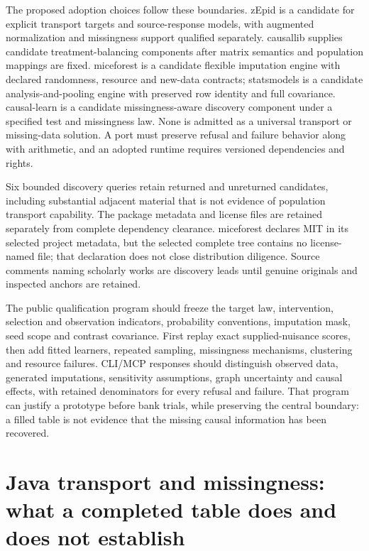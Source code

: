 The proposed adoption choices follow these boundaries. zEpid is a candidate for explicit transport targets and source-response models, with augmented normalization and missingness support qualified separately. causallib supplies candidate treatment-balancing components after matrix semantics and population mappings are fixed. miceforest is a candidate flexible imputation engine with declared randomness, resource and new-data contracts; statsmodels is a candidate analysis-and-pooling engine with preserved row identity and full covariance. causal-learn is a candidate missingness-aware discovery component under a specified test and missingness law. None is admitted as a universal transport or missing-data solution. A port must preserve refusal and failure behavior along with arithmetic, and an adopted runtime requires versioned dependencies and rights.~\citep{exec25_ptm_choice}

Six bounded discovery queries retain returned and unreturned candidates, including substantial adjacent material that is not evidence of population transport capability. The package metadata and license files are retained separately from complete dependency clearance. miceforest declares MIT in its selected project metadata, but the selected complete tree contains no license-named file; that declaration does not close distribution diligence. Source comments naming scholarly works are discovery leads until genuine originals and inspected anchors are retained.~\citep{exec25_ptm_miceforest,exec25_ptm_choice}

The public qualification program should freeze the target law, intervention, selection and observation indicators, probability conventions, imputation mask, seed scope and contrast covariance. First replay exact supplied-nuisance scores, then add fitted learners, repeated sampling, missingness mechanisms, clustering and resource failures. CLI/MCP responses should distinguish observed data, generated imputations, sensitivity assumptions, graph uncertainty and causal effects, with retained denominators for every refusal and failure. That program can justify a prototype before bank trials, while preserving the central boundary: a filled table is not evidence that the missing causal information has been recovered.~\citep{exec25_ptm_choice}


\section[Java transport and missingness contracts]{Java transport and missingness: what a completed table does and does not establish}
\label{sec:exec25-jtm}

